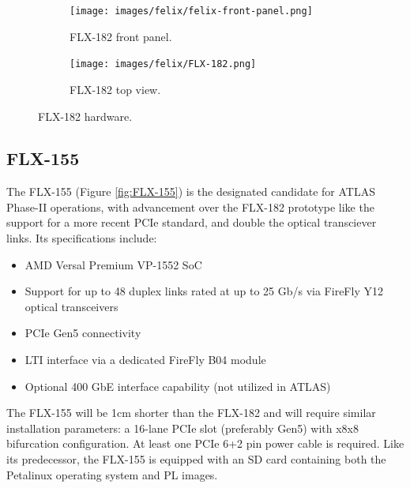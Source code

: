 \begin{figure}[H]
\centering
\begin{subfigure}[b]{0.48\textwidth}
    \centering
    \texttt{[image: images/felix/felix-front-panel.png]}
    \caption{FLX-182 front panel.}
    \label{fig:FLX-182-panel}
\end{subfigure}
\hfill
\begin{subfigure}[b]{0.48\textwidth}
    \centering
    \texttt{[image: images/felix/FLX-182.png]}
    \caption{FLX-182 top view.}
    \label{fig:FLX-182}
\end{subfigure}
\caption{FLX-182 hardware.}
\label{fig:FLX-182-combined}
\end{figure}

\subsection{FLX-155}

The FLX-155 (Figure \ref{fig:FLX-155}) is the designated candidate for \acs{ATLAS} Phase-II operations, with advancement over the FLX-182 prototype like the support for a more recent \acs{PCIe} standard, and double the optical transciever links. Its specifications include:

\begin{itemize}
    \item AMD Versal Premium VP-1552 SoC
    \item Support for up to 48 duplex links rated at up  to 25 Gb/s via FireFly Y12 optical transceivers
    \item \acs{PCIe} Gen5 connectivity
    \item \acs{LTI} interface via a dedicated FireFly B04 module
    \item Optional 400 GbE interface capability (not utilized in ATLAS)
\end{itemize}

The FLX-155 will be 1cm shorter than the FLX-182 and will require similar installation parameters: a 16-lane \acs{PCIe} slot (preferably Gen5) with x8x8 bifurcation configuration. At least one \acs{PCIe} 6+2 pin power cable is required. Like its predecessor, the FLX-155 is equipped with an SD card containing both the Petalinux operating system and \acl{PL} images.

